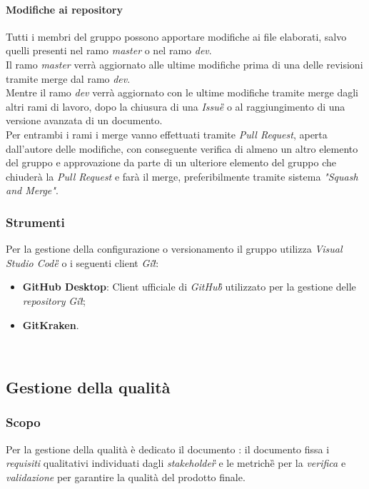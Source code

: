 		\paragraph*{Modifiche ai repository}
		\aCapo{}  
		Tutti i membri del gruppo possono apportare modifiche ai file elaborati, salvo quelli presenti nel ramo \textit{master} o nel ramo \textit{dev}. \\
		 Il ramo \textit{master} verrà aggiornato alle ultime modifiche prima di una delle revisioni tramite merge dal ramo \textit{dev}. \\
		Mentre il ramo \textit{dev} verrà aggiornato con le ultime modifiche tramite merge dagli altri rami di lavoro, dopo la chiusura di una \textit{Issue\G{}} o al raggiungimento di una versione avanzata di un documento. \\
		Per entrambi i rami i merge vanno effettuati tramite \textit{Pull Request}, aperta dall'autore delle modifiche, con conseguente verifica di almeno un altro elemento del gruppo e approvazione da parte di un ulteriore elemento del gruppo che chiuderà la \textit{Pull Request} e farà il merge, preferibilmente tramite sistema \textit{"Squash and Merge"}.
		
		\subsubsection{Strumenti}
			Per la gestione della configurazione o versionamento il gruppo utilizza \emph{Visual Studio Code\G{}} o i seguenti client \emph{Git\G}:
				
				\begin{itemize}
					\item \textbf{GitHub Desktop}: Client ufficiale di \emph{GitHub\G{}} utilizzato per la gestione delle \emph{repository} \emph{Git\G};
					\item \textbf{GitKraken}.
				\end{itemize}\
		
		\subsection{Gestione della qualità}
			\subsubsection{Scopo}
				Per la gestione della qualità è dedicato il documento \PdQ{}: il documento fissa i \emph{requisiti} qualitativi individuati dagli \emph{stakeholder\G{}} e le metriche\G{} per la \emph{verifica} e \emph{validazione} per garantire la qualità del prodotto finale.
		
